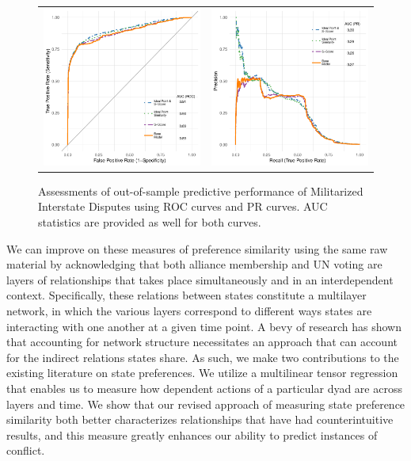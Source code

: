 \documentclass[12pt,pdflatex]{elsarticle}
\begin{document}
\begin{figure}[ht]
	\centering
	\begin{tabular}{cc}
	\includegraphics[width=.5\textwidth]{roc_outSample_noLatAngle.pdf} &
	\includegraphics[width=.5\textwidth]{rocPr_outSample_noLatAngle.pdf}
	\end{tabular}
	\caption{Assessments of out-of-sample predictive performance of Militarized Interstate Disputes using ROC curves and PR curves. AUC statistics are provided as well for both curves.}
	\label{fig:rocShitty}
\end{figure}

We can improve on these measures of preference similarity using the same raw material by acknowledging that both alliance membership and UN voting are layers of relationships that takes place simultaneously and in an interdependent context. Specifically, these relations between states constitute a multilayer network, in which the various layers correspond to different ways states are interacting with one another at a given time point. A bevy of research has shown that accounting for network structure necessitates an approach that can account for the indirect relations states share. As such, we make two contributions to the existing literature on state preferences. We utilize a multilinear tensor regression that enables us to measure how dependent actions of a particular dyad are across layers and time. We show that our revised approach of measuring state preference similarity both better characterizes relationships that have had counterintuitive results, and this measure greatly enhances our ability to predict instances of conflict.
\end{document}
